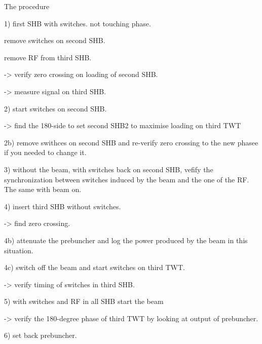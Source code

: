 The procedure 

1) first SHB with switches. not touching phase. 

remove switches on second SHB. 

remove RF from third SHB. 

-> verify zero crossing on loading of second SHB. 

-> measure signal on third SHB. 


2) start switches on second SHB. 

-> find the 180-side to set second SHB2 to maximise loading on third TWT 

2b) remove swithces on second SHB and re-verify zero crossing to the new phasee if you needed to change it. 

3) without the beam, with switches back on second SHB, vefify the synchronization between switches induced by the beam and the one of the RF. 
The same with beam on. 

4) insert third SHB without switches. 

-> find zero crossing. 

4b) attenuate the prebuncher and log the power produced by the beam in this situation. 

4c) switch off the beam and start switches on third TWT. 

-> verify timing of switches in third SHB. 

5) with switches and RF in all SHB start the beam 

-> verify the 180-degree phase of third TWT by looking at output of prebuncher. 

6) set back prebuncher. 






